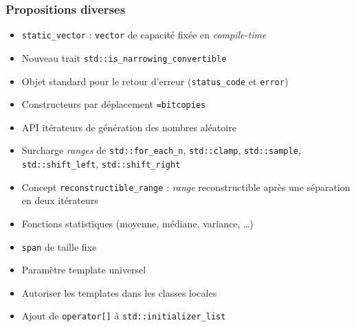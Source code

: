 \documentclass[C++.tex]{subfiles}
\begin{document}
\begin{frame}[fragile]
	\frametitle{Propositions diverses}
	\begin{itemize}
		\item \lstinline|static_vector| : \lstinline|vector| de capacité fixée en \textit{compile-time}
		
	
		\item Nouveau trait \lstinline|std::is_narrowing_convertible|
		\item Objet standard pour le retour d'erreur (\lstinline|status_code| et \lstinline|error|)
		\item Constructeurs par déplacement \lstinline|=bitcopies|
		\item API \og itérateurs\fg{} de génération des nombres aléatoire
		\item Surcharge \og \textit{ranges}\fg{} de \lstinline|std::for_each_n|, \lstinline|std::clamp|, \lstinline|std::sample|, \lstinline|std::shift_left|, \lstinline|std::shift_right|
		\item Concept \lstinline|reconstructible_range| : \textit{range} reconstructible après une séparation en deux itérateurs
		\item Fonctions statistiques (moyenne, médiane, variance, \ldots)
		\item \lstinline|span| de taille fixe
		\item Paramètre template universel


		\item Autoriser les templates dans les classes locales
		\item Ajout de \lstinline|operator[]| à \lstinline|std::initializer_list|
	\end{itemize}
\end{frame}
\end{document}

